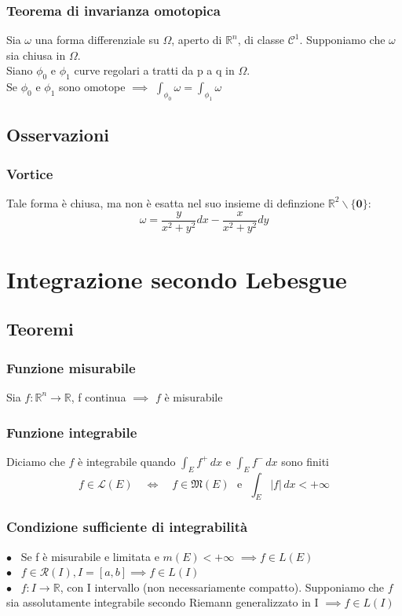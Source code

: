 \documentclass{article} %
\begin{document}
    \subsubsection*{Teorema di invarianza omotopica}
    Sia $\omega$ una forma differenziale su $\Omega$, aperto di $\mathbb{R}^n$, di classe $\mathcal{C}^1$. Supponiamo che $\omega$ sia chiusa in $\Omega$. \\
    Siano $\phi_0$ e $\phi_1$ curve regolari a tratti da p a q in $\Omega$. \\
    Se $\phi_0$ e $\phi_1$ sono omotope $\implies$ $\int_{\phi_0} \omega = \int_{\phi_1} \omega$

    \subsection{Osservazioni}
    \subsubsection*{Vortice}
    Tale forma è chiusa, ma non è esatta nel suo insieme di definzione $\mathbb{R}^2 \backslash \{\mathbf{0}\}$:
    $$\omega = \frac{y}{x^2+y^2} dx - \frac{x}{x^2 + y^2}dy$$
    



    \section{Integrazione secondo Lebesgue}
    \subsection{Teoremi}
    \subsubsection*{Funzione misurabile}
    Sia $f:\mathbb{R} ^n \to \mathbb{R} $, f continua $\implies$ $f$ è misurabile  

    \subsubsection*{Funzione integrabile}
    Diciamo che $f$ è integrabile quando $\int_{E}^{ }f^+\,dx$ e $\int_{E}^{ }f^-\,dx$ sono finiti
    $$ f \in \mathcal{L} (E) \, \, \, \, \, \,  \Longleftrightarrow \, \, \, \, \, \,  f \in \mathfrak{M} (E) \,\, \, \,  \text{e} \,\, \, \,  \int_{E}^{ }|f|\,dx < +\infty  $$

    \subsubsection*{Condizione sufficiente di integrabilità}
    $\bullet$ \, Se f è misurabile e limitata e $m(E) < + \infty$ $\implies f \in L(E)$ \\
    $\bullet$ \, $f \in \mathcal{R} (I), I=[a,b] \implies f \in L(I)$ \\
    $\bullet$ \, $f: I \to \mathbb{R}$, con I intervallo (non necessariamente compatto). Supponiamo che $f$ sia assolutamente integrabile secondo Riemann generalizzato in I $\implies f \in L(I)$
\end{document}
